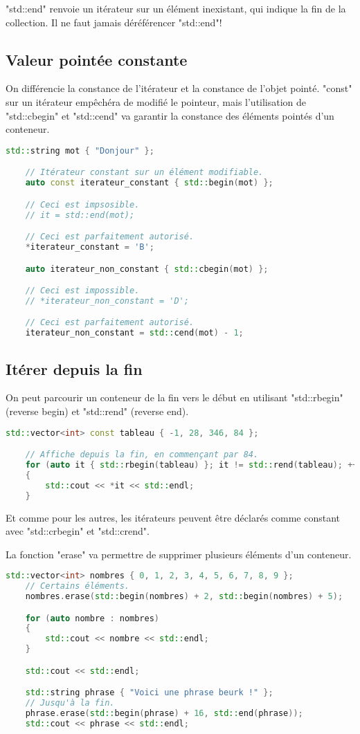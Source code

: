 \documentclass{article}
\begin{document}
"std::end" renvoie un itérateur sur un élément inexistant, qui indique la fin de la collection. Il ne faut jamais déréférencer "std::end"!

\subsection{Valeur pointée constante}
On différencie la constance de l'itérateur et la constance de l'objet pointé. "const" sur un itérateur empêchéra de modifié le pointeur, mais l'utilisation de "std::cbegin" et "std::cend" va garantir la constance des éléments pointés d'un conteneur.

\begin{lstlisting}[language=c++]
    std::string mot { "Donjour" };

    // Itérateur constant sur un élément modifiable.
    auto const iterateur_constant { std::begin(mot) };

    // Ceci est impsosible.
    // it = std::end(mot);

    // Ceci est parfaitement autorisé.
    *iterateur_constant = 'B';

    auto iterateur_non_constant { std::cbegin(mot) };

    // Ceci est impossible.
    // *iterateur_non_constant = 'D';

    // Ceci est parfaitement autorisé.
    iterateur_non_constant = std::cend(mot) - 1;
\end{lstlisting}{}

\subsection{Itérer depuis la fin}
On peut parcourir un conteneur de la fin vers le début en utilisant "std::rbegin" (reverse begin) et "std::rend" (reverse end).

\begin{lstlisting}[language=C++]
    std::vector<int> const tableau { -1, 28, 346, 84 };

    // Affiche depuis la fin, en commençant par 84.
    for (auto it { std::rbegin(tableau) }; it != std::rend(tableau); ++it)
    {
        std::cout << *it << std::endl;
    }
\end{lstlisting}
Et comme pour les autres, les itérateurs peuvent être déclarés comme constant avec "std::crbegin" et "std::crend".

La fonction "erase" va permettre de supprimer plusieurs éléments d'un conteneur.
\begin{lstlisting}[language=c++]
std::vector<int> nombres { 0, 1, 2, 3, 4, 5, 6, 7, 8, 9 };
    // Certains éléments.
    nombres.erase(std::begin(nombres) + 2, std::begin(nombres) + 5);

    for (auto nombre : nombres)
    {
        std::cout << nombre << std::endl;
    }

    std::cout << std::endl;

    std::string phrase { "Voici une phrase beurk !" };
    // Jusqu'à la fin.
    phrase.erase(std::begin(phrase) + 16, std::end(phrase));
    std::cout << phrase << std::endl;
\end{lstlisting}
\end{document}
